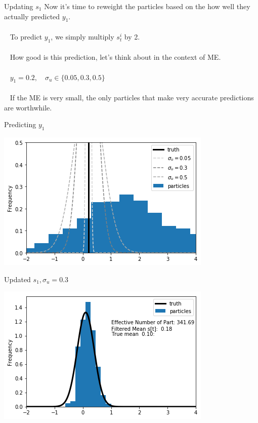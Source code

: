 \documentclass[presentation]{beamer}
\begin{document}
\begin{frame}[label={sec:org766d0c9}]{Updating \(s_1\)}
Now it's time to reweight the particles based on the how well they
actually predicted \(y_1\).
\\~\\~  
To predict \(y_1\), we simply multiply \(s_t^i\) by 2. 
\\~\\~  
How good is this prediction, let's think about in the context of ME.
\\~\\~  
\(y_1 = 0.2, \quad \sigma_u \in\{0.05, 0.3, 0.5\}\)
\\~\\~  
If the ME is very small, the only particles that make very accurate predictions are worthwhile.
\end{frame}
\begin{frame}[label={sec:orgc50614e}]{Predicting \(y_1\)}
\begin{center}
\includegraphics[width=.9\linewidth]{updated.png}
\end{center}
\end{frame}

\begin{frame}[label={sec:org5b4e2cd}]{Updated \(s_1, \sigma_u = 0.3\)}
\begin{center}
\includegraphics[width=.9\linewidth]{updated2.png}
\end{center}
\end{frame}
\end{document}
